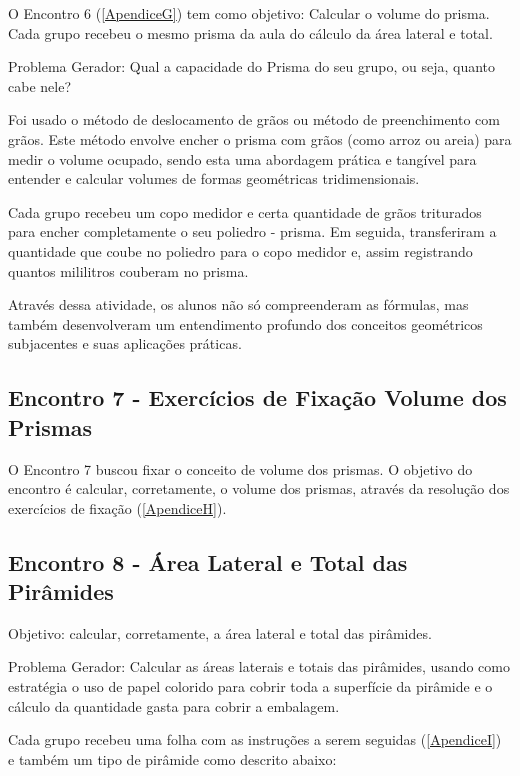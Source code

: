 O Encontro 6 (\autoref{ApendiceG}) tem como objetivo: Calcular o volume do prisma. Cada grupo recebeu o mesmo prisma da aula do cálculo da área lateral e total.

Problema Gerador: Qual a capacidade do Prisma do seu grupo, ou seja, quanto cabe nele?

Foi usado o método de deslocamento de grãos ou método de preenchimento com grãos. Este método envolve encher o prisma com grãos (como arroz ou areia) para medir o volume ocupado, sendo esta uma abordagem prática e tangível para entender e calcular volumes de formas geométricas tridimensionais.

Cada grupo recebeu um copo medidor e  certa quantidade de grãos triturados para encher completamente o seu poliedro - prisma. Em seguida, transferiram a quantidade que coube no poliedro para o copo medidor e, assim registrando quantos mililitros couberam no prisma.

Através dessa atividade, os alunos não só compreenderam as fórmulas, mas também desenvolveram um entendimento profundo dos conceitos geométricos subjacentes e suas aplicações práticas.

\subsection{Encontro 7 - Exercícios de Fixação Volume dos Prismas}

O Encontro 7 buscou fixar o conceito de volume dos prismas. O objetivo do encontro é calcular, corretamente, o volume dos prismas, através da resolução dos exercícios de fixação (\autoref{ApendiceH}).

\subsection{Encontro 8 - Área Lateral e Total das Pirâmides}

Objetivo: calcular, corretamente, a área lateral e total das pirâmides.

Problema Gerador: Calcular as áreas laterais e totais das pirâmides, usando como estratégia o uso de papel colorido para cobrir toda a superfície da pirâmide e o cálculo da quantidade gasta para cobrir a embalagem.

Cada grupo recebeu uma folha com as instruções a serem seguidas (\autoref{ApendiceI}) e também um tipo de pirâmide como descrito abaixo:

